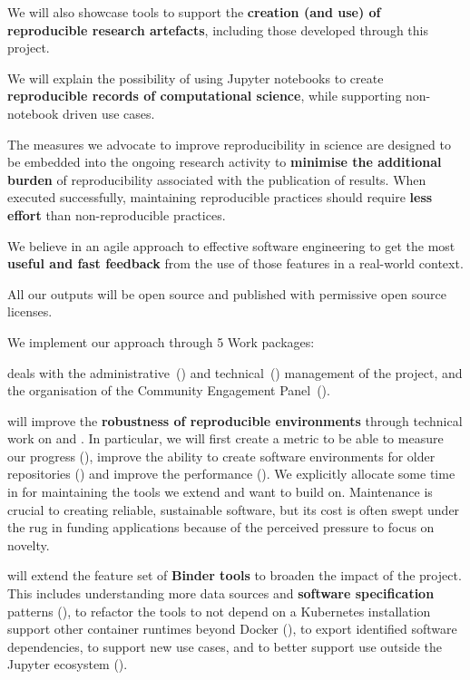 \begin{compactenum}
  We will also showcase tools to support the \textbf{creation (and use) of reproducible
  research artefacts}, including those developed through this project.
\item We will explain the possibility of using Jupyter notebooks to create
  \textbf{reproducible records of computational science}, while supporting non-notebook
  driven use cases.
\item The measures we advocate to improve reproducibility in science are
  designed to be embedded into the ongoing research activity to \textbf{minimise the
  additional burden} of reproducibility associated with the publication of results.
  When executed successfully, maintaining reproducible practices should require
  \textbf{less effort} than non-reproducible practices.
\item We believe in an agile approach to effective software engineering to get
  the most \textbf{useful and fast feedback} from the use of those features in a real-world context.
\item All our outputs will be open source and published with permissive
  open source licenses.
\end{compactenum}


\medskip
\noindent We implement our approach through 5 Work packages:

 deals with the administrative~()
and technical~() management of the
project, and the organisation of the Community Engagement
Panel~().

 will improve the \textbf{robustness of reproducible
environments} through technical work on \repotodocker{} and \binderhub{}. In
particular, we will first create a metric to be able to measure our progress
(), improve the ability to create
software environments for older repositories
() and improve the
performance (). We
explicitly allocate some time in  for
maintaining the tools we extend and want to build on. Maintenance is crucial
to creating reliable, sustainable software, but its cost is often swept
under the rug in funding applications because of the perceived pressure to
focus on novelty.

 will extend the feature set of \textbf{Binder tools} to broaden
the impact of the project. This
includes understanding more data sources and \textbf{software specification} patterns
(), to refactor the tools to not depend on a
Kubernetes installation support other container runtimes beyond Docker
(), to export identified software dependencies,
to support new use cases, and to
better support use outside the Jupyter ecosystem ().

